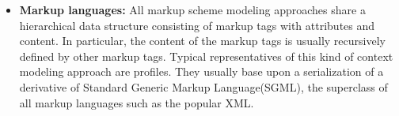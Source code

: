\begin{itemize}

\item \textbf{Markup languages: } All markup scheme modeling approaches share a hierarchical data structure consisting of markup tags with attributes and content. In particular, the content of the markup tags is usually recursively defined by other markup tags. Typical representatives of this kind of context modeling approach are profiles. They usually base upon a serialization of a derivative of Standard Generic Markup Language(SGML), the superclass of all markup languages such as the popular XML\cite{Strang2004}.

\end{itemize}




